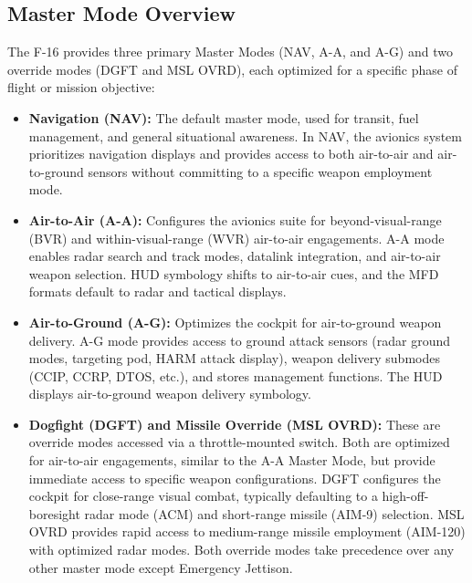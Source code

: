 \documentclass[11pt, a4paper, twoside]{report}
\begin{document}
\subsection{Master Mode Overview}
\label{sec:C2-S2-S1}

The F-16 provides three primary Master Modes (NAV, A-A, and A-G) and two override modes (DGFT and MSL OVRD), each optimized for a specific phase of flight or mission objective:

\begin{itemize}
	\item \textbf{Navigation (NAV):} The default master mode, used for transit, fuel management, and general situational awareness. In NAV, the avionics system prioritizes navigation displays and provides access to both air-to-air and air-to-ground sensors without committing to a specific weapon employment mode.
	
	\item \textbf{Air-to-Air (A-A):} Configures the avionics suite for beyond-visual-range (BVR) and within-visual-range (WVR) air-to-air engagements. A-A mode enables radar search and track modes, datalink integration, and air-to-air weapon selection. HUD symbology shifts to air-to-air cues, and the MFD formats default to radar and tactical displays.
	
	\item \textbf{Air-to-Ground (A-G):} Optimizes the cockpit for air-to-ground weapon delivery. A-G mode provides access to ground attack sensors (radar ground modes, targeting pod, HARM attack display), weapon delivery submodes (CCIP, CCRP, DTOS, etc.), and stores management functions. The HUD displays air-to-ground weapon delivery symbology.
	
	\item \textbf{Dogfight (DGFT) and Missile Override (MSL OVRD):} These are override 	modes accessed via a throttle-mounted switch. Both are optimized for air-to-air engagements, similar to the A-A Master Mode, but provide immediate access to specific weapon configurations. DGFT configures the cockpit for close-range visual combat, typically defaulting to a high-off-boresight radar mode (ACM) and short-range missile (AIM-9) selection. MSL OVRD provides rapid access to medium-range missile employment (AIM-120) with optimized radar modes. Both override modes take precedence over any other master mode except Emergency Jettison.
\end{itemize}
\end{document}
